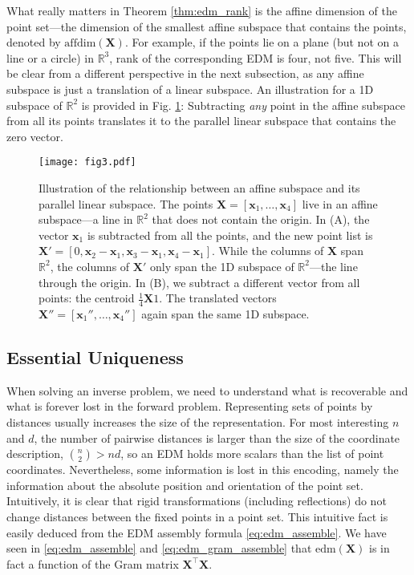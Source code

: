 \documentclass[10pt,double]{IEEEtran}
\providecommand{\R}{\ensuremath{\mathbb{R}}}
\renewcommand{\vec}[1]{\ensuremath{\boldsymbol{#1}}}
\providecommand{\mat}[1]{\ensuremath{\boldsymbol{#1}}}
\providecommand{\mX}{\mat{X}}\providecommand{\mY}{\mat{Y}}
\providecommand{\vx}{\vec{x}} \providecommand{\vy}{\vec{y}}
\newcommand{\EDM}{\ensuremath{\mathrm{edm}}}
\newcommand{\vone}{\ensuremath{\vec{\mathit{1}}}}
\renewcommand{\vzero}{\ensuremath{\vec{\mathit{0}}}}
\newcommand{\T}{\ensuremath{\top}}
\newcommand{\affdim}{\ensuremath{\mathrm{affdim}}}
\begin{document}
What really matters in Theorem \ref{thm:edm_rank} is the affine dimension of
the point set---the dimension of the smallest affine subspace that contains
the points, denoted by $\affdim(\mX)$. For example, if the points lie on a
plane (but not on a line or a circle) in $\R^3$, rank of the corresponding EDM
is four, not five. This will be clear from a different perspective in the next
subsection, as any affine subspace is just a translation of a linear subspace.
An illustration for a 1D subspace of $\R^2$ is provided in Fig.
\ref{fig:affine}: Subtracting \emph{any} point in the affine subspace from all
its points translates it to the parallel linear subspace that contains the
zero vector.

\begin{figure}
\centering
\texttt{[image: fig3.pdf]}
\caption{Illustration of the relationship between an affine subspace and its
parallel linear subspace. The points $\mX = [\vx_1, \ldots, \vx_4]$ live in an
affine subspace---a line in $\R^2$ that does not contain the origin. In (A),
the vector $\vx_1$ is subtracted from all the points, and the new point list
is $\mX' = [\vzero, \vx_2 - \vx_1, \vx_3 - \vx_1, \vx_4 - \vx_1]$. While the
columns of $\mX$ span $\R^2$, the columns of $\mX'$ only span the 1D subspace
of $\R^2$---the line through the origin. In (B), we subtract a different
vector from all points: the centroid $\frac{1}{4} \mX
\vone$. The translated vectors $\mX'' = [\vx_1'', \ldots, \vx_4'']$ again span
the same 1D subspace.}
\label{fig:affine}
\end{figure}



\subsection{Essential Uniqueness} \label{sub:essential_uniqueness}

When solving an inverse problem, we need to understand what is recoverable and
what is forever lost in the forward problem. Representing sets of points by
distances usually increases the size of the representation. For most
interesting $n$ and $d$, the number of pairwise distances is larger than the
size of the coordinate description, $\binom{n}{2} > nd$, so an EDM holds
more scalars than the list of point coordinates. Nevertheless, some
information is lost in this encoding, namely the information about the
absolute position and orientation of the point set. Intuitively, it is clear
that rigid transformations (including reflections) do not change distances
between the fixed points in a point set. This intuitive fact is easily deduced
from the EDM assembly formula \eqref{eq:edm_assemble}. We have seen in
\eqref{eq:edm_assemble} and \eqref{eq:edm_gram_assemble} that $\EDM(\mX)$ is
in fact a function of the Gram matrix $\mX^\T \mX$.
\end{document}

